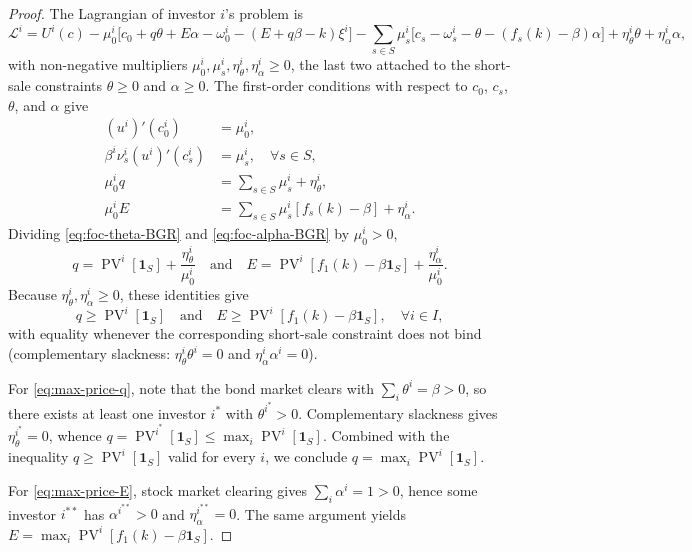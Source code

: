 \documentclass[11pt,a4paper,oneside]{book}
\def\1{\mathbf{1}}
\def\leq{\leqslant}
\def\geq{\geqslant}
\def\et{\quad \text{and} \quad}
\DeclareMathOperator{\PV}{PV}
\theoremstyle{plain}
\theoremstyle{definition}
\theoremstyle{remark}
\numberwithin{equation}{chapter}
\begin{document}
\begin{proof}
The Lagrangian of investor $i$'s problem is
\begin{equation*}
  \mathcal{L}^i = U^i(c) - \mu^i_0 \bigl[c_0 + q \theta + E \alpha - \omega^i_0 - (E + q \beta - k) \xi^i\bigr]
  - \sum_{s \in S} \mu^i_s \bigl[c_s - \omega^i_s - \theta - (f_s(k) - \beta) \alpha\bigr]
  + \eta^i_\theta \theta + \eta^i_\alpha \alpha,
\end{equation*}
with non-negative multipliers $\mu^i_0, \mu^i_s, \eta^i_\theta, \eta^i_\alpha \geq 0$, the last two attached to the short-sale constraints $\theta \geq 0$ and $\alpha \geq 0$.
The first-order conditions with respect to $c_0$, $c_s$, $\theta$, and $\alpha$ give
\begin{align}
  (u^i)'(c^i_0) &= \mu^i_0,
  \label{eq:foc-c0-BGR}\\
  \beta^i \nu^i_s (u^i)'(c^i_s) &= \mu^i_s, \quad \forall s \in S,
  \label{eq:foc-cs-BGR}\\
  \mu^i_0 q &= \sum_{s \in S} \mu^i_s + \eta^i_\theta,
  \label{eq:foc-theta-BGR}\\
  \mu^i_0 E &= \sum_{s \in S} \mu^i_s [f_s(k) - \beta] + \eta^i_\alpha.
  \label{eq:foc-alpha-BGR}
\end{align}
Dividing \eqref{eq:foc-theta-BGR} and \eqref{eq:foc-alpha-BGR} by $\mu^i_0 > 0$,
\begin{equation}\label{eq:FOC-inequalities}
  q = \PV^i[\1_S] + \frac{\eta^i_\theta}{\mu^i_0}
  \et
  E = \PV^i[f_1(k) - \beta \1_S] + \frac{\eta^i_\alpha}{\mu^i_0}.
\end{equation}
Because $\eta^i_\theta, \eta^i_\alpha \geq 0$, these identities give
\begin{equation*}
  q \geq \PV^i[\1_S]
  \et
  E \geq \PV^i[f_1(k) - \beta \1_S],
  \quad \forall i \in I,
\end{equation*}
with equality whenever the corresponding short-sale constraint does not bind (complementary slackness: $\eta^i_\theta \theta^i = 0$ and $\eta^i_\alpha \alpha^i = 0$).

For \eqref{eq:max-price-q}, note that the bond market clears with $\sum_i \theta^i = \beta > 0$, so there exists at least one investor $i^\ast$ with $\theta^{i^\ast} > 0$.
Complementary slackness gives $\eta^{i^\ast}_\theta = 0$, whence $q = \PV^{i^\ast}[\1_S] \leq \max_i \PV^i[\1_S]$.
Combined with the inequality $q \geq \PV^i[\1_S]$ valid for every $i$, we conclude $q = \max_i \PV^i[\1_S]$.

For \eqref{eq:max-price-E}, stock market clearing gives $\sum_i \alpha^i = 1 > 0$, hence some investor $i^{\ast\ast}$ has $\alpha^{i^{\ast\ast}} > 0$ and $\eta^{i^{\ast\ast}}_\alpha = 0$.
The same argument yields $E = \max_i \PV^i[f_1(k) - \beta \1_S]$.
\end{proof}
\end{document}

